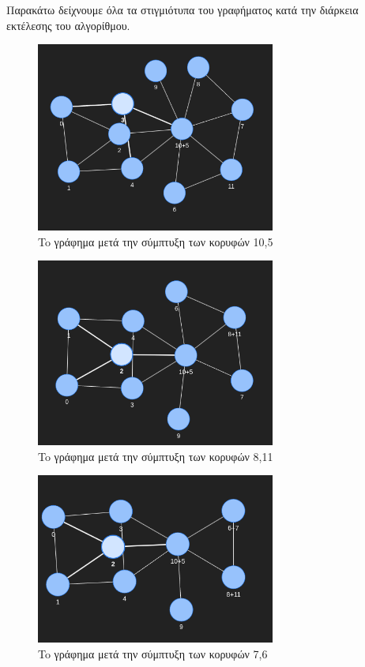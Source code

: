 Παρακάτω δείχνουμε όλα τα στιγμιότυπα του γραφήματος κατά την διάρκεια εκτέλεσης του αλγορίθμου.

\begin{figure}[H]
	\centering
	\includegraphics[width=0.7\textwidth]{pictures/coloring-2.png} 
	\caption{To γράφημα μετά την σύμπτυξη των κορυφών 10,5}
	\label{fig:at-free-graph-pyvis-3-colouring-2}
\end{figure}

\begin{figure}[H]
	\centering
	\includegraphics[width=0.7\textwidth]{pictures/coloring-3.png} 
	\caption{To γράφημα μετά την σύμπτυξη των κορυφών 8,11}
	\label{fig:at-free-graph-pyvis-3-colouring-3}
\end{figure}

\begin{figure}[H]
	\centering
	\includegraphics[width=0.7\textwidth]{pictures/coloring-4.png} 
	\caption{To γράφημα μετά την σύμπτυξη των κορυφών 7,6}
	\label{fig:at-free-graph-pyvis-3-colouring-4}
\end{figure}

